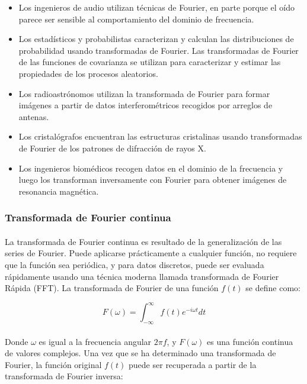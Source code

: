\documentclass[12pt]{article}%
\begin{document}
\begin{itemize}
\item{Los ingenieros de audio utilizan técnicas de Fourier, en parte porque el oído parece ser sensible al comportamiento del dominio de frecuencia.}
\item{Los estadísticos y probabilistas caracterizan y calculan las distribuciones de probabilidad usando transformadas de Fourier. Las transformadas de Fourier de las funciones de covarianza se utilizan para caracterizar y estimar las propiedades de los procesos aleatorios.}
\item{Los radioastrónomos utilizan la transformada de Fourier para formar imágenes a partir de datos interferométricos recogidos por arreglos de antenas.}
\item{Los cristalógrafos encuentran las estructuras cristalinas usando transformadas de Fourier de los patrones de difracción de rayos X.}
\item{Los ingenieros biomédicos recogen datos en el dominio de la frecuencia y luego los transforman
inversamente con Fourier para obtener imágenes de resonancia magnética.}
\end{itemize}

\subsubsection{Transformada de Fourier continua}
\paragraph{}
La transformada de Fourier continua es resultado de la generalización de las series de Fourier. Puede aplicarse prácticamente a cualquier función, no requiere que la función sea periódica, y para datos discretos, puede ser evaluada rápidamente usando una técnica moderna llamada transformada de Fourier Rápida (FFT). La transformada de Fourier de una función $f(t)$ se define \cite{anthony} como:

\begin{equation}
F(\omega)=\int_{-\infty}^{\infty}f(t)e^{-i{\omega}t}dt
\end{equation}

\paragraph{}
Donde $\omega$ es igual a la frecuencia angular $2{\pi}f$, y $F(\omega)$ es una función continua de valores complejos. Una vez que se ha determinado una transformada de Fourier, la función original $f(t)$ puede ser recuperada a partir de la transformada de Fourier inversa:
\end{document}
